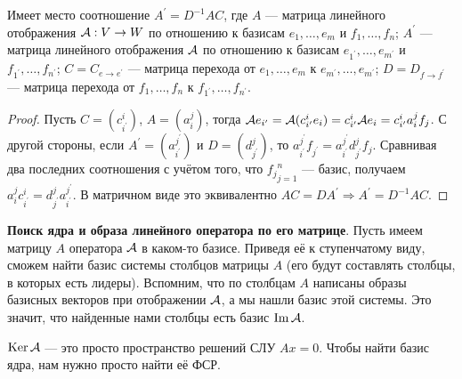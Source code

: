 \begin{theorem}
    Имеет место соотношение $A^\prime = D^{-1}AC$, где $A$ --- матрица линейного отображения $\mathcal{A}: V \to W$ по отношению к базисам $e_1, \ldots, e_m$ и $f_1, \ldots, f_n$; $A^\prime$ --- матрица линейного отображения $\mathcal{A}$ по отношению к базисам $e_{1^\prime}, \ldots, e_{m^\prime}$ и $f_{1^\prime}, \ldots, f_{n^\prime}$; $C = C_{e \to e^\prime}$ --- матрица перехода от $e_1, \ldots, e_m$ к $e_{m^\prime}, \ldots, e_{m^\prime}$; $D = D_{f \to f^\prime}$ --- матрица перехода от $f_1, \ldots, f_n$ к $f_{1^\prime}, \ldots, f_{n^\prime}$.
\end{theorem}

\begin{proof}
    Пусть $C = (c^i_{i^\prime})$, $A = (a^j_i)$, тогда $\mathcal{A} e_{i^\prime} = \mathcal{A}(c^i_{i^\prime}e_i) = c^i_{i^\prime}\mathcal{A} e_i = c^i_{i^\prime}a^j_if_j$. С другой стороны, если $A^\prime = (a^{j^\prime}_{i^\prime})$ и $D = (d^j_{j^\prime})$, то $a^{j^\prime}_{i^\prime}f_{j^\prime} = a^{j^\prime}_{i^\prime}d^j_{j^\prime}f_j$. Сравнивая два последних соотношения с учётом того, что ${f_j}_{j = 1}^n$ --- базис, получаем $a^j_ic^i_{i^\prime} = d^j_{j^\prime}a^{j^\prime}_{i^\prime}$. В матричном виде это эквивалентно $AC = DA^\prime \Rightarrow A^\prime = D^{-1}AC$.
\end{proof}

\textbf{Поиск ядра и образа линейного оператора по его матрице}. Пусть имеем матрицу $A$ оператора $\mathcal{A}$ в каком-то базисе. Приведя её к ступенчатому виду, сможем найти базис системы столбцов матрицы $A$ (его будут составлять столбцы, в которых есть лидеры). Вспомним, что по столбцам $A$ написаны образы базисных векторов при отображении $\mathcal{A}$, а мы нашли базис этой системы. Это значит, что найденные нами столбцы есть базис $\operatorname{Im}\mathcal{A}$.

$\operatorname{Ker}\mathcal{A}$ --- это просто пространство решений СЛУ $Ax = 0$. Чтобы найти базис ядра, нам нужно просто найти её ФСР.

